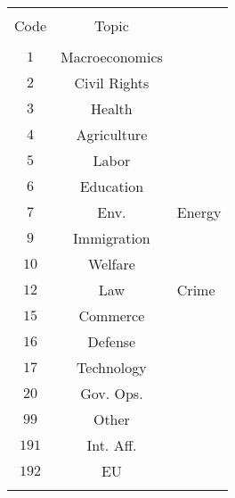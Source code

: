 
\begin{table}[!htbp] \centering 
  \caption{} 
  \label{} 
\begin{tabular}{@{\extracolsep{5pt}} cc} 
\\[-1.8ex]\hline 
\hline \\[-1.8ex] 
Code & Topic \\ 
\hline \\[-1.8ex] 
$1$ & Macroeconomics \\ 
$2$ & Civil Rights \\ 
$3$ & Health \\ 
$4$ & Agriculture \\ 
$5$ & Labor \\ 
$6$ & Education \\ 
$7$ & Env. & Energy \\ 
$9$ & Immigration \\ 
$10$ & Welfare \\ 
$12$ & Law & Crime \\ 
$15$ & Commerce \\ 
$16$ & Defense \\ 
$17$ & Technology \\ 
$20$ & Gov. Ops. \\ 
$99$ & Other \\ 
$191$ & Int. Aff. \\ 
$192$ & EU \\ 
\hline \\[-1.8ex] 
\end{tabular} 
\end{table} 
